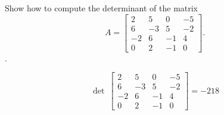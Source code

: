 
\begin{exerciseStatement}


Show how to compute the determinant of the matrix \[A= \left[\begin{array}{cccc}
2 & 5 & 0 & -5 \\
6 & -3 & 5 & -2 \\
-2 & 6 & -1 & 4 \\
0 & 2 & -1 & 0
\end{array}\right] .\].


\end{exerciseStatement}
    
\begin{exerciseAnswer} 
\[\operatorname{det}\  \left[\begin{array}{cccc}
2 & 5 & 0 & -5 \\
6 & -3 & 5 & -2 \\
-2 & 6 & -1 & 4 \\
0 & 2 & -1 & 0
\end{array}\right] = -218 \]
\end{exerciseAnswer}
    
